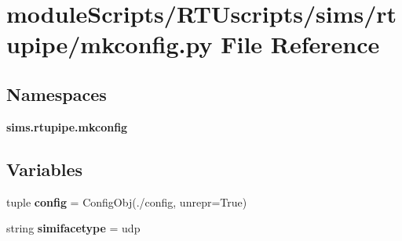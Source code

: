 \section{module\+Scripts/\+R\+T\+Uscripts/sims/rtupipe/mkconfig.py File Reference}
\label{rtupipe_2mkconfig_8py}
\subsection*{Namespaces}
\begin{DoxyCompactItemize}
\item 
 {\bf sims.\+rtupipe.\+mkconfig}
\end{DoxyCompactItemize}
\subsection*{Variables}
\begin{DoxyCompactItemize}
\item 
tuple {\bf config} = Config\+Obj(\textquotesingle{}./config\textquotesingle{}, unrepr=True)
\item 
string {\bf simifacetype} = \textquotesingle{}udp\textquotesingle{}
\end{DoxyCompactItemize}
